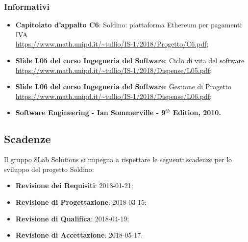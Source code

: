 \subsubsection{Informativi}
\begin{itemize}
	\item \textbf{Capitolato d'appalto C6}: Soldino: piattaforma Ethereum per pagamenti IVA \\
	\url{https://www.math.unipd.it/~tullio/IS-1/2018/Progetto/C6.pdf};
	\item \textbf{Slide L05 del corso Ingegneria del Software}: Ciclo di vita 
	del software \\
	\url{https://www.math.unipd.it/~tullio/IS-1/2018/Dispense/L05.pdf};
	\item \textbf{Slide L06 del corso Ingegneria del Software}: Gestione di 
	Progetto \\
	\url{https://www.math.unipd.it/~tullio/IS-1/2018/Dispense/L06.pdf};
	\item \textbf{Software Engineering - Ian Sommerville - 9$^{th}$ Edition, 
	2010.}
\end{itemize}

\hypertarget{scadenze}{\subsection{Scadenze}}
Il gruppo 8Lab Solutions si impegna a rispettare le seguenti scadenze per lo 
sviluppo del progetto Soldino:

\begin{itemize}
	\item \textbf{Revisione dei Requisiti}: 2018-01-21;
	\item \textbf{Revisione di Progettazione}: 2018-03-15;
	\item \textbf{Revisione di Qualifica}: 2018-04-19;
	\item \textbf{Revisione di Accettazione}: 2018-05-17.
\end{itemize}